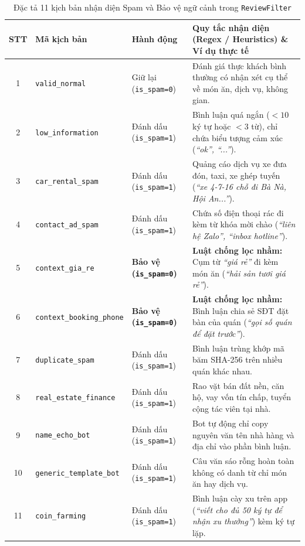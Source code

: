 \documentclass[12pt, a4paper, oneside]{book}
\begin{document}
\begin{table}[H]
\centering
\caption{Đặc tả 11 kịch bản nhận diện Spam và Bảo vệ ngữ cảnh trong \texttt{ReviewFilter}}
\label{tab:spam_cases}
\vspace{0.15cm}
\scriptsize
\begin{tabularx}{\textwidth}{c l l X}
\toprule
\rowcolor{blue!8}
\textbf{STT} & \textbf{Mã kịch bản} & \textbf{Hành động} & \textbf{Quy tắc nhận diện (Regex / Heuristics) \& Ví dụ thực tế} \\
\midrule
1 & \texttt{valid\_normal} & Giữ lại (\texttt{is\_spam=0}) & Đánh giá thực khách bình thường có nhận xét cụ thể về món ăn, dịch vụ, không gian. \\
2 & \texttt{low\_information} & Đánh dấu (\texttt{is\_spam=1}) & Bình luận quá ngắn ($< 10$ ký tự hoặc $< 3$ từ), chỉ chứa biểu tượng cảm xúc (\textit{``ok'', ``...''}). \\
3 & \texttt{car\_rental\_spam} & Đánh dấu (\texttt{is\_spam=1}) & Quảng cáo dịch vụ xe đưa đón, taxi, xe ghép tuyến (\textit{``xe 4-7-16 chỗ đi Bà Nà, Hội An...''}). \\
4 & \texttt{contact\_ad\_spam} & Đánh dấu (\texttt{is\_spam=1}) & Chứa số điện thoại rác đi kèm từ khóa mời chào (\textit{``liên hệ Zalo'', ``inbox hotline''}). \\
5 & \texttt{context\_gia\_re} & \textbf{Bảo vệ (\texttt{is\_spam=0})} & \textbf{Luật chống lọc nhầm:} Cụm từ \textit{``giá rẻ''} đi kèm món ăn (\textit{``hải sản tươi giá rẻ''}). \\
6 & \texttt{context\_booking\_phone} & \textbf{Bảo vệ (\texttt{is\_spam=0})} & \textbf{Luật chống lọc nhầm:} Bình luận chia sẻ SĐT đặt bàn của quán (\textit{``gọi số quán để đặt trước''}). \\
7 & \texttt{duplicate\_spam} & Đánh dấu (\texttt{is\_spam=1}) & Bình luận trùng khớp mã băm SHA-256 trên nhiều quán khác nhau. \\
8 & \texttt{real\_estate\_finance} & Đánh dấu (\texttt{is\_spam=1}) & Rao vặt bán đất nền, căn hộ, vay vốn tín chấp, tuyển cộng tác viên tại nhà. \\
9 & \texttt{name\_echo\_bot} & Đánh dấu (\texttt{is\_spam=1}) & Bot tự động chỉ copy nguyên văn tên nhà hàng và địa chỉ vào phần bình luận. \\
10 & \texttt{generic\_template\_bot} & Đánh dấu (\texttt{is\_spam=1}) & Câu văn sáo rỗng hoàn toàn không có danh từ chỉ món ăn hay dịch vụ. \\
11 & \texttt{coin\_farming} & Đánh dấu (\texttt{is\_spam=1}) & Bình luận cày xu trên app (\textit{``viết cho đủ 50 ký tự để nhận xu thưởng''}) kèm ký tự lặp. \\
\bottomrule
\end{tabularx}
\end{table}
\end{document}
